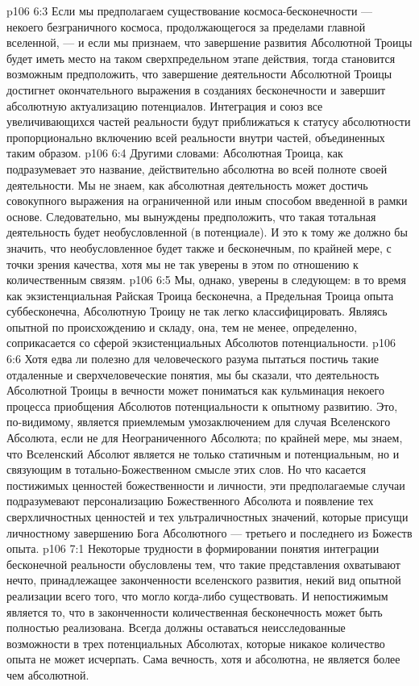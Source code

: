 \vs p106 6:3 Если мы предполагаем существование космоса\hyp{}бесконечности --- некоего безграничного космоса, продолжающегося за пределами главной вселенной, --- и если мы признаем, что завершение развития Абсолютной Троицы будет иметь место на таком сверхпредельном этапе действия, тогда становится возможным предположить, что завершение деятельности Абсолютной Троицы достигнет окончательного выражения в созданиях бесконечности и завершит абсолютную актуализацию  потенциалов. Интеграция и союз все увеличивающихся частей реальности будут приближаться к статусу абсолютности пропорционально включению всей реальности внутри частей, объединенных таким образом.
\vs p106 6:4 Другими словами: Абсолютная Троица, как подразумевает это название, действительно абсолютна во всей полноте своей деятельности. Мы не знаем, как абсолютная деятельность может достичь совокупного выражения на ограниченной или иным способом введенной в рамки основе. Следовательно, мы вынуждены предположить, что такая тотальная деятельность будет необусловленной (в потенциале). И это к тому же должно бы значить, что необусловленное будет также и бесконечным, по крайней мере, с точки зрения качества, хотя мы не так уверены в этом по отношению к количественным связям.
\vs p106 6:5 Мы, однако, уверены в следующем: в то время как экзистенциальная Райская Троица бесконечна, а Предельная Троица опыта суббесконечна, Абсолютную Троицу не так легко классифицировать. Являясь опытной по происхождению и складу, она, тем не менее, определенно, соприкасается со сферой экзистенциальных Абсолютов потенциальности.
\vs p106 6:6 Хотя едва ли полезно для человеческого разума пытаться постичь такие отдаленные и сверхчеловеческие понятия, мы бы сказали, что деятельность Абсолютной Троицы в вечности может пониматься как кульминация некоего процесса приобщения Абсолютов потенциальности к опытному развитию. Это, по\hyp{}видимому, является приемлемым умозаключением для случая Вселенского Абсолюта, если не для Неограниченного Абсолюта; по крайней мере, мы знаем, что Вселенский Абсолют является не только статичным и потенциальным, но и связующим в тотально\hyp{}Божественном смысле этих слов. Но что касается постижимых ценностей божественности и личности, эти предполагаемые случаи подразумевают персонализацию Божественного Абсолюта и появление тех сверхличностных ценностей и тех ультраличностных значений, которые присущи личностному завершению Бога Абсолютного --- третьего и последнего из Божеств опыта.
\vs p106 7:1 Некоторые трудности в формировании понятия интеграции бесконечной реальности обусловлены тем, что такие представления охватывают нечто, принадлежащее законченности вселенского развития, некий вид опытной реализации всего того, что могло когда\hyp{}либо существовать. И непостижимым является то, что в законченности количественная бесконечность может быть полностью реализована. Всегда должны оставаться неисследованные возможности в трех потенциальных Абсолютах, которые никакое количество опыта не может исчерпать. Сама вечность, хотя и абсолютна, не является более чем абсолютной.
